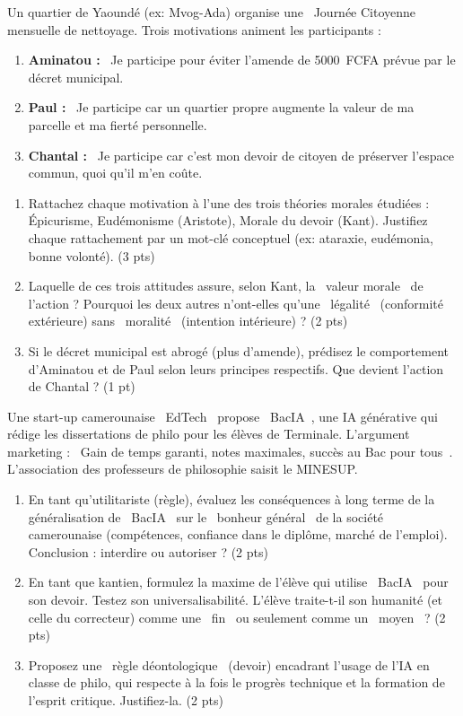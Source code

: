 \documentclass[11pt]{article}
\begin{document}
\begin{exercice}
Un quartier de Yaoundé (ex: Mvog-Ada) organise une \og~Journée Citoyenne~\fg{} mensuelle de nettoyage. Trois motivations animent les participants :
\begin{enumerate}
    \item \textbf{Aminatou :} \og~Je participe pour éviter l'amende de \SI{5000}{FCFA} prévue par le décret municipal.~\fg{}
    \item \textbf{Paul :} \og~Je participe car un quartier propre augmente la valeur de ma parcelle et ma fierté personnelle.~\fg{}
    \item \textbf{Chantal :} \og~Je participe car c'est mon devoir de citoyen de préserver l'espace commun, quoi qu'il m'en coûte.~\fg{}
\end{enumerate}
\begin{enumerate}
    \item Rattachez chaque motivation à l'une des trois théories morales étudiées : Épicurisme, Eudémonisme (Aristote), Morale du devoir (Kant). Justifiez chaque rattachement par un mot-clé conceptuel (ex: ataraxie, eudémonia, bonne volonté). (3 pts)
    \item Laquelle de ces trois attitudes assure, selon Kant, la \og~valeur morale~\fg{} de l'action ? Pourquoi les deux autres n'ont-elles qu'une \og~légalité~\fg{} (conformité extérieure) sans \og~moralité~\fg{} (intention intérieure) ? (2 pts)
    \item Si le décret municipal est abrogé (plus d'amende), prédisez le comportement d'Aminatou et de Paul selon leurs principes respectifs. Que devient l'action de Chantal ? (1 pt)
\end{enumerate}
\end{exercice}

\begin{exercice}
Une start-up camerounaise \og~EdTech~\fg{} propose \og~BacIA~\fg{}, une IA générative qui rédige les dissertations de philo pour les élèves de Terminale. L'argument marketing : \og~Gain de temps garanti, notes maximales, succès au Bac pour tous~\fg{}. L'association des professeurs de philosophie saisit le MINESUP.
\begin{enumerate}
    \item En tant qu'utilitariste (règle), évaluez les conséquences à long terme de la généralisation de \og~BacIA~\fg{} sur le \og~bonheur général~\fg{} de la société camerounaise (compétences, confiance dans le diplôme, marché de l'emploi). Conclusion : interdire ou autoriser ? (2 pts)
    \item En tant que kantien, formulez la maxime de l'élève qui utilise \og~BacIA~\fg{} pour son devoir. Testez son universalisabilité. L'élève traite-t-il son humanité (et celle du correcteur) comme une \og~fin~\fg{} ou seulement comme un \og~moyen~\fg{} ? (2 pts)
    \item Proposez une \og~règle déontologique~\fg{} (devoir) encadrant l'usage de l'IA en classe de philo, qui respecte à la fois le progrès technique et la formation de l'esprit critique. Justifiez-la. (2 pts)
\end{enumerate}
\end{exercice}
\end{document}
